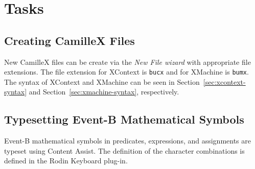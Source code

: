 \section{Tasks}
\label{sec:tasks}

\subsection{Creating CamilleX Files}
\label{sec:creating-xevent-b}

New CamilleX files can be create via the \emph{New File wizard} with appropriate file extensions. The file extension for XContext is \texttt{bucx} and for XMachine is \texttt{bumx}.  The syntax of XContext and XMachine can be seen in Section~\ref{sec:xcontext-syntax} and Section~\ref{sec:xmachine-syntax}, respectively.

\subsection{Typesetting Event-B Mathematical Symbols}
\label{sec:typesetting-event-b}
Event-B mathematical symbols in predicates, expressions, and assignments are typeset using Content Assist.  The definition of the character combinations is defined in the Rodin Keyboard plug-in.


